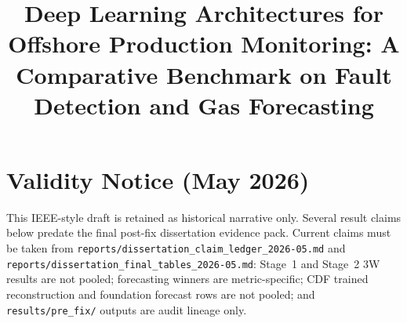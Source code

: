\documentclass[conference]{IEEEtran}
\begin{document}
\title{Deep Learning Architectures for Offshore Production Monitoring: A Comparative Benchmark on Fault Detection and Gas Forecasting}

\author{
}

\maketitle

\section*{Validity Notice (May 2026)}
This IEEE-style draft is retained as historical narrative only. Several result
claims below predate the final post-fix dissertation evidence pack. Current
claims must be taken from \texttt{reports/dissertation\_claim\_ledger\_2026-05.md}
and \texttt{reports/dissertation\_final\_tables\_2026-05.md}: Stage~1 and
Stage~2 3W results are not pooled; forecasting winners are metric-specific;
CDF trained reconstruction and foundation forecast rows are not pooled; and
\texttt{results/pre\_fix/} outputs are audit lineage only.
\end{document}

